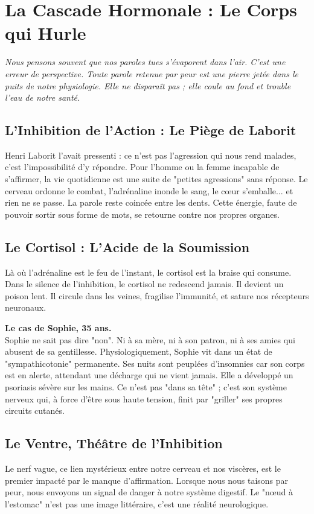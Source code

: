\chapter{La Cascade Hormonale : Le Corps qui Hurle}

\textit{Nous pensons souvent que nos paroles tues s'évaporent dans l'air. C'est une erreur de perspective. Toute parole retenue par peur est une pierre jetée dans le puits de notre physiologie. Elle ne disparaît pas ; elle coule au fond et trouble l'eau de notre santé.}

\section{L'Inhibition de l'Action : Le Piège de Laborit}
Henri Laborit l'avait pressenti : ce n'est pas l'agression qui nous rend malades, c'est l'impossibilité d'y répondre. Pour l'homme ou la femme incapable de s'affirmer, la vie quotidienne est une suite de "petites agressions" sans réponse. Le cerveau ordonne le combat, l'adrénaline inonde le sang, le cœur s'emballe... et rien ne se passe. La parole reste coincée entre les dents. Cette énergie, faute de pouvoir sortir sous forme de mots, se retourne contre nos propres organes.

\section{Le Cortisol : L'Acide de la Soumission}
Là où l'adrénaline est le feu de l'instant, le cortisol est la braise qui consume. Dans le silence de l'inhibition, le cortisol ne redescend jamais. Il devient un poison lent. Il circule dans les veines, fragilise l'immunité, et sature nos récepteurs neuronaux. 

\begin{NoteClinique}
\textbf{Le cas de Sophie, 35 ans.} \\
Sophie ne sait pas dire "non". Ni à sa mère, ni à son patron, ni à ses amies qui abusent de sa gentillesse. Physiologiquement, Sophie vit dans un état de "sympathicotonie" permanente. Ses nuits sont peuplées d'insomnies car son corps est en alerte, attendant une décharge qui ne vient jamais. Elle a développé un psoriasis sévère sur les mains. Ce n'est pas "dans sa tête" ; c'est son système nerveux qui, à force d'être sous haute tension, finit par "griller" ses propres circuits cutanés.
\end{NoteClinique}

\section{Le Ventre, Théâtre de l'Inhibition}
Le nerf vague, ce lien mystérieux entre notre cerveau et nos viscères, est le premier impacté par le manque d'affirmation. Lorsque nous nous taisons par peur, nous envoyons un signal de danger à notre système digestif. Le "nœud à l'estomac" n'est pas une image littéraire, c'est une réalité neurologique. 
